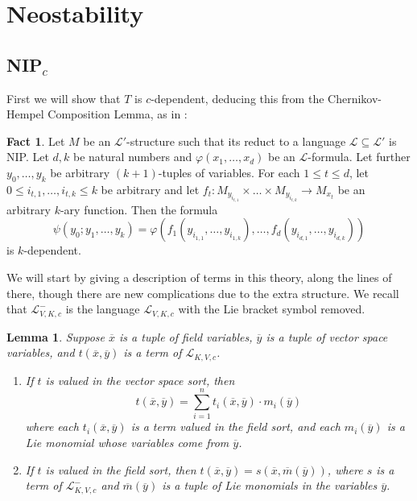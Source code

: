 \documentclass[psamsfonts]{amsart}
\newtheorem{lemma}[thm]{Lemma}
\theoremstyle{definition}
\newtheorem{fact}[thm]{Fact}
\theoremstyle{definition}
\theoremstyle{remark}
\numberwithin{equation}{section}
\newcommand\LL{\mathscr{L}}
\begin{document}
\section{Neostability}
\subsection{NIP$_c$}
First we will show that $T$ is $c$-dependent, deducing this from the Chernikov-Hempel Composition Lemma, as in \cite[Theorem 5.20]{d2023model}: 

\begin{fact} \label{composition lemma} \cite{ChernikovHempel3}
Let $M$ be an $\LL'$-structure such that its reduct to a language $\LL \subseteq \LL'$ is NIP.  Let $d,k$ be natural numbers and $\varphi(x_{1}, \ldots, x_{d})$ be an $\LL$-formula. Let further $y_{0}, \ldots, y_{k}$ be arbitrary $(k+1)$-tuples of variables.  For each $1 \leq t \leq d$, let 
$0 \leq i_{t,1}, \ldots, i_{t,k} \leq k$ be arbitrary and let $f_{t} : M_{y_{i_{t,1}}} \times \ldots \times M_{y_{i_{t,k}}} \to M_{x_{t}}$ be an arbitrary $k$-ary function.  Then the formula 
$$
\psi(y_{0}; y_{1}, \ldots, y_{k}) = \varphi(f_{1}(y_{i_{1,1}}, \ldots, y_{i_{1,k}}), \ldots, f_{d}(y_{i_{d,1}}, \ldots, y_{i_{d,k}}))
$$
is $k$-dependent. 
\end{fact}




We will start by giving a description of terms in this theory, along the lines of \cite[Lemma 5.17]{d2023model} there, though there are new complications due to the extra structure. We recall that $\LL^{-}_{V,K,c}$ is the language $\LL_{V,K,c}$ with the Lie bracket symbol removed. 

\begin{lemma} \label{term description 2}
    Suppose $\overline{x}$ is a tuple of field variables, $\overline{y}$ is a tuple of vector space variables, and $t(\overline{x},\overline{y})$ is a term of $\LL_{K,V,c}$. 
    \begin{enumerate}
        \item If $t$ is valued in the vector space sort, then 
        $$
        t(\overline{x},\overline{y}) = \sum_{i = 1}^{n} t_{i}(\overline{x},\overline{y}) \cdot m_{i}(\overline{y})
        $$
        where each $t_{i}(\overline{x},\overline{y})$ is a term valued in the field sort, and each $m_{i}(\overline{y})$ is a Lie monomial whose variables come from $\overline{y}$.  
        \item If $t$ is valued in the field sort, then $t(\overline{x},\overline{y}) = s(\overline{x},\overline{m}(\overline{y}))$, where $s$ is a term of $\LL_{K,V,c}^{-}$ and $\overline{m}(\overline{y})$ is a tuple of Lie monomials in the variables $\overline{y}$. 
    \end{enumerate}
\end{lemma}
\end{document}
